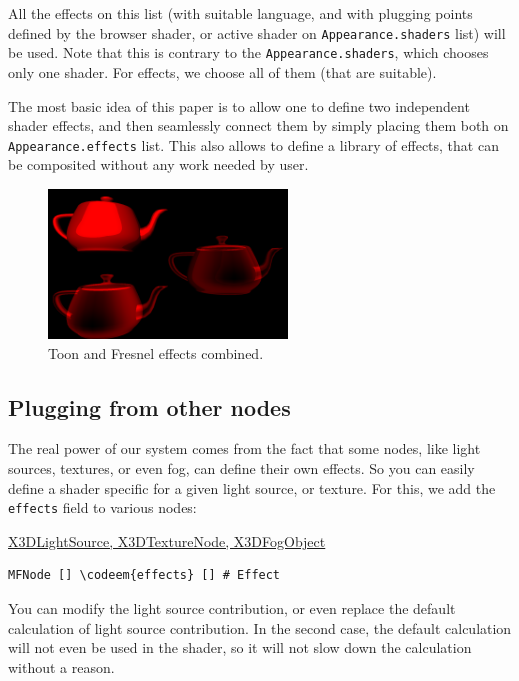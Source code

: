 \documentclass{acmsiggraph}                     %
\newenvironment{mycode}
{\begin{mycodecore}}
{\end{mycodecore}
\vspace{-0.1in}}
\newcommand*{\codeem}[1]{\textbf{#1}}
\begin{document}
All the effects on this list (with suitable language, and with
plugging points defined by the browser shader, or active shader on
\texttt{Appearance.shaders} list) will be used. Note that this is contrary to
the \texttt{Appearance.shaders}, which chooses only one shader.
For effects, we choose all of them (that are suitable).

\needspace{1in}
The most basic idea of this paper is to allow one to define two
independent shader effects, and then seamlessly connect them by simply
placing them both on \texttt{Appearance.effects} list. This also allows to
define a library of effects, that can be composited without any work
needed by user.

\begin{figure}[H]
  \centering
  \includegraphics[width=2.5in]{fresnel_and_toon}
  \caption{Toon and Fresnel effects combined.}
\end{figure}

\subsection{Plugging from other nodes}

The real power of our system comes from the fact that some nodes,
like light sources, textures, or even fog, can define their own effects.
So you can easily define a shader specific for a given light source,
or texture. For this, we add the \texttt{effects} field to various nodes:

\begin{mycode}
\underline{X3DLightSource, X3DTextureNode, X3DFogObject}
\begin{Verbatim}[commandchars=\\\{\}]
MFNode [] \codeem{effects} [] # Effect
\end{Verbatim}
\end{mycode}


You can modify the light source contribution, or even replace the default
calculation of light source contribution. In the second case,
the default calculation will not even be used in the shader,
so it will not slow down the calculation without a reason.
\end{document}
